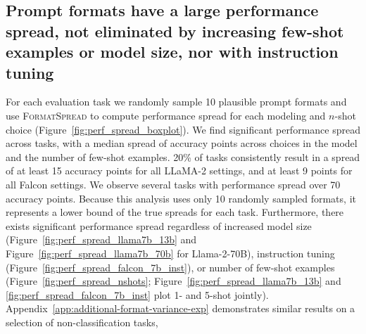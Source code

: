 \documentclass{article} %
\newcommand{\editmel}[1]{}
\renewcommand{\editmel}[1]{{\color{black}{#1}}}
\newcommand{\tbdone}[1]{}
\renewcommand{\tbdone}[1]{{\color{black}{#1}}}  %
\newcommand{\toolname}[1]{}
\renewcommand{\toolname}[1]{{\color{black} \textsc{FormatSpread}}}
\begin{document}
\subsection{Prompt formats have a large performance spread, not eliminated by increasing few-shot examples or model size, nor with instruction tuning}\label{sec:format-variance-exp} %
\vspace{-1mm}
For each evaluation task we randomly sample 10 plausible prompt formats and use \toolname{} to compute performance spread for each modeling and $n$-shot choice (Figure~\ref{fig:perf_spread_boxplot}).
We find significant performance spread across tasks, with a median spread of \tbdone{7.5} accuracy points across choices in the model and the number of few-shot examples.
20\% of tasks consistently result in a spread of at least 15 accuracy points for all LLaMA-2 settings, and at least 9 points for all Falcon settings.
We observe several tasks with performance spread over 70 accuracy points.
Because this analysis uses only 10 randomly sampled formats, it represents a lower bound of the true spreads for each task.
Furthermore, there exists significant performance spread regardless of increased model size (Figure~\ref{fig:perf_spread_llama7b_13b} and Figure~\ref{fig:perf_spread_llama7b_70b} for Llama-2-70B), instruction tuning (Figure~\ref{fig:perf_spread_falcon_7b_inst}), or number of few-shot examples (Figure~\ref{fig:perf_spread_nshots}; Figure~\ref{fig:perf_spread_llama7b_13b} and \ref{fig:perf_spread_falcon_7b_inst} plot 1- and 5-shot jointly).
Appendix~\ref{app:additional-format-variance-exp} demonstrates similar results on a selection of non-classification tasks, \editmel{and expands the spread discussion to plotting the entire accuracy distribution, along with a dispersion metric.}


\end{document}
